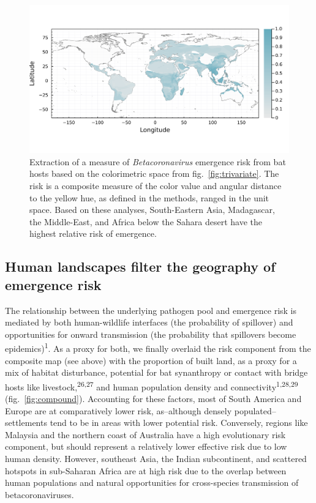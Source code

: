\documentclass[11pt]{article}
\makeatletter
\def\maxwidth{\ifdim\Gin@nat@width>\linewidth\linewidth
\else\Gin@nat@width\fi}
\let\Oldincludegraphics\includegraphics
\renewcommand{\includegraphics}[1]{\Oldincludegraphics[width=\maxwidth]{#1}}
\makeatother
\begin{document}
\begin{figure}
\hypertarget{fig:risk}{%
\centering
\includegraphics{figures/risk_map.png}
\caption{Extraction of a measure of \emph{Betacoronavirus} emergence
risk from bat hosts based on the colorimetric space from
fig.~\ref{fig:trivariate}. The risk is a composite measure of the color
value and angular distance to the yellow hue, as defined in the methods,
ranged in the unit space. Based on these analyses, South-Eastern Asia,
Madagascar, the Middle-East, and Africa below the Sahara desert have the
highest relative risk of emergence.}\label{fig:risk}
}
\end{figure}

\hypertarget{human-landscapes-filter-the-geography-of-emergence-risk}{%
\subsection{Human landscapes filter the geography of emergence
risk}\label{human-landscapes-filter-the-geography-of-emergence-risk}}

The relationship between the underlying pathogen pool and emergence risk
is mediated by both human-wildlife interfaces (the probability of
spillover) and opportunities for onward transmission (the probability
that spillovers become epidemics)\textsuperscript{1}. As a proxy for
both, we finally overlaid the risk component from the composite map (see
above) with the proportion of built land, as a proxy for a mix of
habitat disturbance, potential for bat synanthropy or contact with
bridge hosts like livestock,\textsuperscript{26,27} and human population
density and connectivity\textsuperscript{1,28,29}
(fig.~\ref{fig:compound}). Accounting for these factors, most of South
America and Europe are at comparatively lower risk, as--although densely
populated--settlements tend to be in areas with lower potential risk.
Conversely, regions like Malaysia and the northern coast of Australia
have a high evolutionary risk component, but should represent a
relatively lower effective risk due to low human density. However,
southeast Asia, the Indian subcontinent, and scattered hotspots in
sub-Saharan Africa are at high risk due to the overlap between human
populations and natural opportunities for cross-species transmission of
betacoronaviruses.
\end{document}
